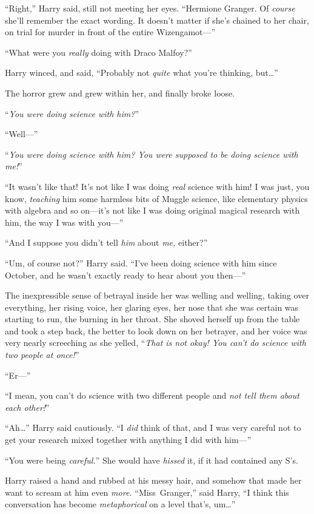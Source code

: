 “Right,” Harry said, still not meeting her eyes. “Hermione Granger. Of \emph{course} she’ll remember the exact wording. It doesn’t matter if she’s chained to her chair, on trial for murder in front of the entire Wizengamot—”

“What were you \emph{really} doing with Draco Malfoy?”

Harry winced, and said, “Probably not \emph{quite} what you’re thinking, but…”

The horror grew and grew within her, and finally broke loose.

“\emph{You were doing \emph{science} with him?}”

“Well—”

“\emph{You were doing \emph{science} with him? You were supposed to be doing science with \emph{me}!}”

“It wasn’t like that! It’s not like I was doing \emph{real} science with him! I was just, you know, \emph{teaching} him some harmless bits of Muggle science, like elementary physics with algebra and so on—it’s not like I was doing original magical research with him, the way I was with you—”

“And I suppose you didn’t tell \emph{him} about \emph{me,} either?”

“Um, of course not?” Harry said. “I’ve been doing science with him since October, and he wasn’t exactly ready to hear about you then—”

The inexpressible sense of betrayal inside her was welling and welling, taking over everything, her rising voice, her glaring eyes, her nose that she was certain was starting to run, the burning in her throat. She shoved herself up from the table and took a step back, the better to look down on her betrayer, and her voice was very nearly screeching as she yelled, “\emph{That is not okay! You can’t do science with two people at once!}”

“Er—”

“I mean, you can’t do science with two different people and \emph{not tell them about each other!}”

“Ah…” Harry said cautiously. “I \emph{did} think of that, and I was very careful not to get your research mixed together with anything I did with him—”

“You were being \emph{careful.}” She would have \emph{hissed} it, if it had contained any S’s.

Harry raised a hand and rubbed at his messy hair, and somehow that made her want to scream at him even \emph{more.} “Miss~Granger,” said Harry, “I think this conversation has become \emph{metaphorical} on a level that’s, um…”

